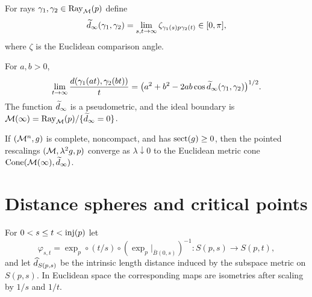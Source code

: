 \begin{definition}
\label{def:chow-iii-i27-ideal-angle}
For rays $\gamma_1,\gamma_2\in\Ray_{\M}(p)$ define
\[
\widetilde d_\infty(\gamma_1,\gamma_2)=\lim_{s,t\to\infty}
\zeta_{\gamma_1(s)p\gamma_2(t)}\in[0,\pi],
\]
where $\zeta$ is the Euclidean comparison angle.
\end{definition}

\begin{lemma}
\label{lem:chow-iii-i27-pseudometric}
For $a,b>0$,
\[
\lim_{t\to\infty}\frac{d(\gamma_1(at),\gamma_2(bt))}{t}
=\bigl(a^2+b^2-2ab\cos\widetilde d_\infty(\gamma_1,\gamma_2)\bigr)^{1/2}.
\]
The function $\widetilde d_\infty$ is a pseudometric, and the ideal boundary is
$\M(\infty)=\Ray_{\M}(p)/\{\ddinf=0\}$.
\end{lemma}

\begin{theorem}
\label{thm:chow-iii-i26-asymptotic-cone}
If $(\M^n,g)$ is complete, noncompact, and has $\operatorname{sect}(g)\ge0$, then the
pointed rescalings $(\M,\lambda^2g,p)$ converge as $\lambda\downarrow0$ to the
Euclidean metric cone $\operatorname{Cone}(\M(\infty),\ddinf)$.
\end{theorem}

\section{Distance spheres and critical points}

\begin{definition}
\label{def:chow-iii-i28-sphere-maps}
For $0<s\le t<\operatorname{inj}(p)$ let
\[
\varphi_{s,t}=\exp_p\circ(t/s)\circ(\exp_p|_{\overline B(0,s)})^{-1}:S(p,s)\to S(p,t),
\]
and let $\widehat d_{S(p,s)}$ be the intrinsic length distance induced by the
subspace metric on $S(p,s)$.  In Euclidean space the corresponding maps are
isometries after scaling by $1/s$ and $1/t$.
\end{definition}

